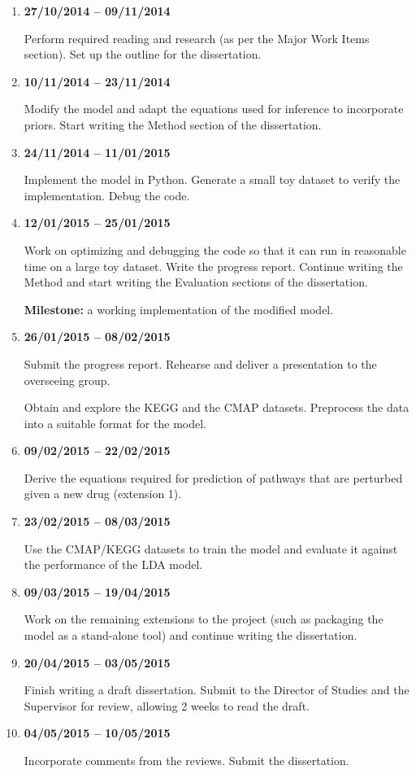 \documentclass[12pt,a4]{article}
\begin{document}
\begin{enumerate}

\item {\bf 27/10/2014 -- 09/11/2014} 

Perform required reading and research (as per the Major Work Items section). Set up the outline for the dissertation.

\item {\bf 10/11/2014 -- 23/11/2014} 

Modify the model and adapt the equations used for inference to incorporate priors. Start writing the Method section of the dissertation.

\item {\bf 24/11/2014 -- 11/01/2015} 

Implement the model in Python. Generate a small toy dataset to verify the implementation. Debug the code.

\item {\bf 12/01/2015 -- 25/01/2015}

Work on optimizing and debugging the code so that it can run in reasonable time on a large toy dataset. Write the progress report. Continue writing the Method and start writing the Evaluation sections of the dissertation.

\textbf{Milestone:} a working implementation of the modified model. 

\item {\bf 26/01/2015 -- 08/02/2015} 

Submit the progress report. Rehearse and deliver a presentation to the overseeing group.

Obtain and explore the KEGG and the CMAP datasets. Preprocess the data into a suitable format for the model.

\item {\bf 09/02/2015 -- 22/02/2015}

Derive the equations required for prediction of pathways that are perturbed given a new drug (extension 1).

\item {\bf 23/02/2015 -- 08/03/2015}

Use the CMAP/KEGG datasets to train the model and evaluate it against the performance of the LDA model.

\item {\bf 09/03/2015 -- 19/04/2015}

Work on the remaining extensions to the project (such as packaging the model as a stand-alone tool) and continue writing the dissertation.

\item {\bf 20/04/2015 -- 03/05/2015}

Finish writing a draft dissertation. Submit to the Director of Studies and the Supervisor for review, allowing 2 weeks to read the draft.

\item {\bf 04/05/2015 -- 10/05/2015}

Incorporate comments from the reviews. Submit the dissertation.

\end{enumerate}



\end{document}
